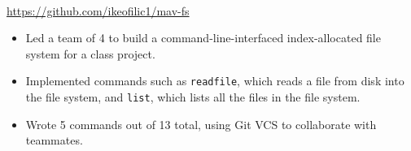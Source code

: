 \\
{\url{https://github.com/ikeofilic1/mav-fs}}
\begin{itemize}
    \item Led a team of 4 to build a command-line-interfaced index-allocated file system for a class project.
    \item Implemented commands such as \verb|readfile|, which reads a file from disk into the file system, and \verb|list|, which lists all the files in the file system.
    \item Wrote 5 commands out of 13 total, using Git VCS to collaborate with teammates.
\end{itemize}